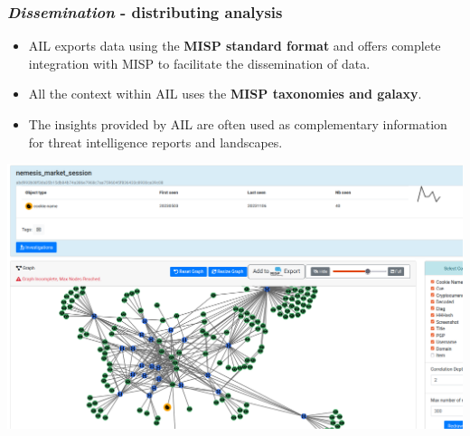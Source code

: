 \documentclass{beamer}
\begin{document}
\begin{frame}
    \frametitle{{\it Dissemination} - distributing analysis}
\begin{itemize}
    \item AIL exports data using the {\bf MISP standard format} and offers complete integration with MISP to facilitate the dissemination of data.
    \item All the context within AIL uses the {\bf MISP taxonomies and galaxy}.
    \item The insights provided by AIL are often used as complementary information for threat intelligence reports and landscapes.
\end{itemize}
    \begin{center}
      \includegraphics[scale=0.15]{images/ail-cookie.png}
    \end{center}
\end{frame}
\end{document}
